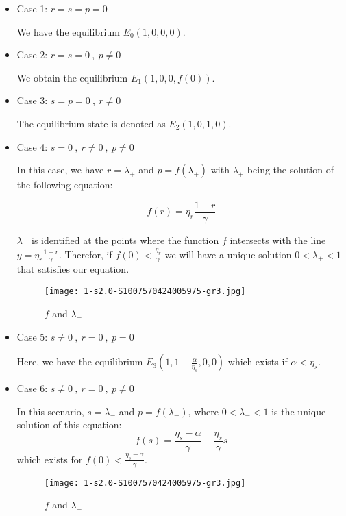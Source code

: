 \begin{itemize}
	\item Case 1: \(r = s = p = 0\)
	
	We have the equilibrium \( E_0 (1,0,0,0)   \).
	\item Case 2:  \( r = s = 0 \ , \ p \neq 0 \)
	
	We obtain the equilibrium  \(E_1 (1,0,0,f(0)) \).
	\item Case 3:   \( s = p = 0 \ , \ r \neq 0 \)
	
	The equilibrium state is denoted as \(E_2 (1,0,1,0) \).
	\item Case 4: \( s = 0 \ , \ r \neq 0 \ , \ p \neq 0 \) 
	
	In this case, we have $r = \lambda_+$ and $p = f(\lambda_+)$ with $\lambda_+$ being the solution of the following equation: 
	
	\begin{equation}
		f(r) = \eta_r \frac{1 - r}{\gamma}
	\end{equation}

	$\lambda_+$ is identified at the points where the function $f$ intersects with the line $y= \eta_r \frac{1 - r}{\gamma}$. Therefor, if $f(0)< \frac{\eta_r}{\gamma} $ we will have a unique solution $0 < \lambda_+ < 1$ that satisfies our equation.
	
	\begin{figure}[h!]
		\centering
		\texttt{[image: 1-s2.0-S1007570424005975-gr3.jpg]}
		\caption{\(f\) and \(\lambda_+\)}
	\end{figure}
	
	\item Case 5:  \(s \neq 0 \ , \ r = 0 \ , \ p = 0 \)
	
	Here, we have the equilibrium $E_3(1,1-\frac{\alpha}{\eta_s},0,0)$ which exists if $\alpha<\eta_s$.
	
	\newpage
	\item Case 6:  \(s \neq 0 \ , \ r = 0 \ , \ p \neq 0 \)
	
	In this scenario, $s=\lambda_-$ and $p = f(\lambda_-)$, where $0 < \lambda_- < 1$ is the unique solution of this equation:
	\begin{equation}
		f(s) = \frac{\eta_s- \alpha}{\gamma} - \frac{\eta_s}{\gamma}s
	\end{equation}
	which exists for $f(0) < \frac{\eta_s- \alpha}{\gamma}$.
	
	\begin{figure}[h!]
		\centering
		\texttt{[image: 1-s2.0-S1007570424005975-gr3.jpg]}
		\caption{\(f\) and \(\lambda_-\)}
	\end{figure}


\end{itemize}
